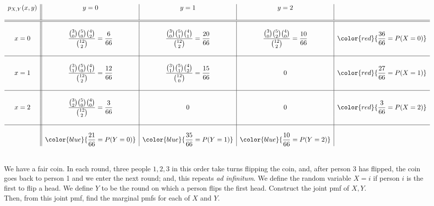 \documentclass[12pt]{article}
\begin{document}
$$\begin{array}{c||c|c|c|c} p_{X,Y}(x,y)  & y=0 & y=1 & y=2 & \quad \\
& & & &\\ \hline\hline
& & & &\\
x=0 & \dfrac {{3\choose 0}{5\choose 0}{4\choose 2}}{{12\choose 2}}=\dfrac {6}{66} & \dfrac {{3\choose 0}{5\choose 1}{4\choose 1}}{{12\choose 2}}= \dfrac {20}{66}& \dfrac {{3\choose 0}{5\choose 2}{4\choose 0}}{{12\choose 2}}= \dfrac {10}{66} & \color{red}{\dfrac {36}{66}=P(X=0)}\\
& & & &\\ \hline
& & & &\\
x=1 & \dfrac {{3\choose 1}{5\choose 0}{4\choose 1}}{{12\choose 2}}= \dfrac {12}{66}& \dfrac {{3\choose 1}{5\choose 1}{4\choose 2}}{{12\choose 0}}= \dfrac {15}{66}& 0 & \color{red}{\dfrac {27}{66}=P(X=1)}\\
& & & &\\ \hline
& & & &\\
x=2 & \dfrac {{3\choose 2}{5\choose 0}{4\choose 0}}{{12\choose 2}}= \dfrac {3}{66}& 0 & 0 & \color{red}{\dfrac {3}{66}=P(X=2)}\\
& & & &\\ \hline
& & & &\\
& \color{blue}{\dfrac {21}{66}=P(Y=0)} & \color{blue}{\dfrac {35}{66}=P(Y=1)} & \color{blue}{\dfrac {10}{66}=P(Y=2)} \end{array}$$







\newpage

\\
We have a fair coin. In each round, three people $1,2,3$ in this order
take turns flipping the coin, and, after person 3 has flipped,
the coin goes back to person 1 and we enter the next round; and, this repeats {\em ad infinitum}.
We define the random variable $X = i$ if person $i$ is the first to flip a head.
We define $Y$ to be the round on which a person flips the first head.
Construct the joint pmf of $X,Y$.\\
Then, from this joint pmf, find the marginal pmfs for each of $X$ and $Y$.\\
\end{document}
